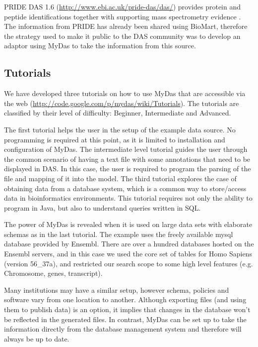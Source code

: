 PRIDE DAS 1.6 (\url{http://www.ebi.ac.uk/pride-das/das/}) provides protein and peptide identifications together with supporting mass spectrometry evidence \cite{VIZ2009}. The information from PRIDE has already been shared using BioMart\cite{KIN2011}, therefore the strategy used to make it public to the DAS community was to develop an adaptor using MyDas to take the information from this source.

\subsection{Tutorials}
We have developed three tutorials on how to use MyDas that are accessible via the web (\url{http://code.google.com/p/mydas/wiki/Tutorials}). The tutorials are classified by their level of difficulty: Beginner, Intermediate and Advanced. 

The first tutorial helps the user in the setup of the example data source. No programming is required at this point, as it is limited to installation and configuration of MyDas. The intermediate level tutorial guides the user through the common scenario of having a text file with some annotations that need to be displayed in DAS. In this case, the user is required to program the parsing of the file and mapping of it into the model. The third tutorial explores the case of obtaining data from a database system, which is a common way to store/access data in bioinformatics environments. This tutorial requires not only the ability to program in Java, but also to understand queries written in SQL.

The power of MyDas is revealed when it is used on large data sets with elaborate schemas as in the last tutorial. The example uses the freely available mysql database provided by Ensembl. There are over a hundred databases hosted on the Ensembl servers, and in this case we used the core set of tables for Homo Sapiens (version 56\_37a), and restricted our search scope to some high level features (e.g. Chromosome, genes, transcript). 

Many institutions may have a similar setup, however schema, policies and software vary from one location to another. Although exporting files (and using them to publish data) is an option, it implies that changes in the database won't be reflected in the generated files. In contrast, MyDas can be set up to take the information directly from the database management system and therefore will always be up to date.

